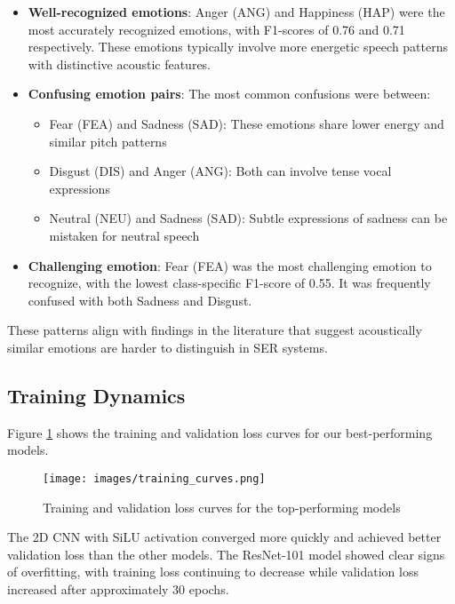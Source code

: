\begin{itemize}
    \item \textbf{Well-recognized emotions}: Anger (ANG) and Happiness (HAP) were the most accurately recognized emotions, with F1-scores of 0.76 and 0.71 respectively. These emotions typically involve more energetic speech patterns with distinctive acoustic features.
    
    \item \textbf{Confusing emotion pairs}: The most common confusions were between:
    \begin{itemize}
        \item Fear (FEA) and Sadness (SAD): These emotions share lower energy and similar pitch patterns
        \item Disgust (DIS) and Anger (ANG): Both can involve tense vocal expressions
        \item Neutral (NEU) and Sadness (SAD): Subtle expressions of sadness can be mistaken for neutral speech
    \end{itemize}
    
    \item \textbf{Challenging emotion}: Fear (FEA) was the most challenging emotion to recognize, with the lowest class-specific F1-score of 0.55. It was frequently confused with both Sadness and Disgust.
\end{itemize}

These patterns align with findings in the literature that suggest acoustically similar emotions are harder to distinguish in SER systems.

\subsection{Training Dynamics}

Figure \ref{fig:training_curves} shows the training and validation loss curves for our best-performing models.

\begin{figure}[h]
    \centering
    \texttt{[image: images/training\_curves.png]}
    \caption{Training and validation loss curves for the top-performing models}
    \label{fig:training_curves}
\end{figure}

The 2D CNN with SiLU activation converged more quickly and achieved better validation loss than the other models. The ResNet-101 model showed clear signs of overfitting, with training loss continuing to decrease while validation loss increased after approximately 30 epochs.

